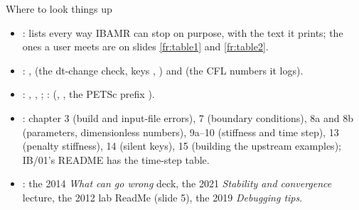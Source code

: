 \documentclass[aspectratio=169,11pt]{beamer}
\begin{document}
\begin{frame}{Where to look things up}
\label{fr:lookup}
\small
\begin{itemize}
  \item {}:  lists every way IBAMR can stop on purpose, with the text it prints; the ones a user meets are on slides \ref{fr:table1} and \ref{fr:table2}.
  \item {}: ,  (the dt-change check, keys , ) and  (the CFL numbers it logs).
  \item {}: , , ; :  (, , the PETSc prefix ).
  \item {}: chapter 3 (build and input-file errors), 7 (boundary conditions), 8a and 8b (parameters, dimensionless numbers), 9a--10 (stiffness and time step), 13 (penalty stiffness), 14 (silent keys), 15 (building the upstream examples); IB/01's README has the time-step table.
  \item {}: the 2014 \emph{What can go wrong} deck, the 2021 \emph{Stability and convergence} lecture, the 2012 lab ReadMe (slide 5), the 2019 \emph{Debugging tips}.
\end{itemize}
\end{frame}
\end{document}
